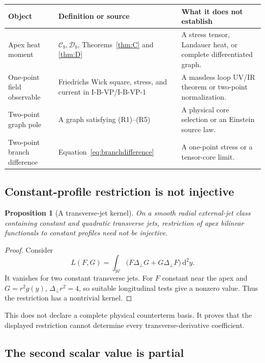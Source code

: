 \documentclass[11pt,a4paper]{article}
\newcommand{\dd}{\mathrm d}
\newcommand{\WW}{\mathcal W}
\newcommand{\Ccal}{\mathcal C}
\newcommand{\Dcal}{\mathcal D}
\theoremstyle{plain}
\newtheorem{proposition}[theorem]{Proposition}
\theoremstyle{definition}
\theoremstyle{remark}
\numberwithin{equation}{section}
\begin{document}
\begin{center}
\small
\begin{tabularx}{\linewidth}{@{}L{.23\linewidth}L{.31\linewidth}Y@{}}
\toprule
Object & Definition or source & What it does not establish\\
\midrule
Apex heat moment &
\(\Ccal_b,\Dcal_b\), Theorems~\ref{thm:C} and \ref{thm:D} &
A stress tensor, Landauer heat, or complete differentiated graph.\\
One-point field observable &
Friedrichs Wick square, stress, and current in I-B-VP/I-B-VP-1
\cite{CheungVP,CheungVP1} &
A massless loop UV/IR theorem or two-point normalization.\\
Two-point graph pole &
A graph satisfying (R1)--(R5) &
A physical core selection or an Einstein source law.\\
Two-point branch difference &
Equation~\eqref{eq:branchdifference} &
A one-point stress or a tensor-core limit.\\
\bottomrule
\end{tabularx}
\end{center}

\subsection{Constant-profile restriction is not injective}

\begin{proposition}[A transverse-jet kernel]
\label{prop:noninjective}
On a smooth radial external-jet class containing constant and
quadratic transverse jets, restriction of apex bilinear
functionals to constant profiles need not be injective.
\end{proposition}

\begin{proof}
Consider
\[
 L(F,G)=\int_\WW
       \bigl(F\Delta_\perp G+G\Delta_\perp F\bigr)\,\dd^2y.
\]
It vanishes for two constant transverse jets.
For \(F\) constant near the apex and \(G=r^2g(y)\),
\(\Delta_\perp r^2=4\), so suitable longitudinal tests give a
nonzero value.
Thus the restriction has a nontrivial kernel.
\end{proof}

This does not declare a complete physical counterterm basis.
It proves that the displayed restriction cannot determine every
transverse-derivative coefficient.

\subsection{The second scalar value is partial}
\end{document}
